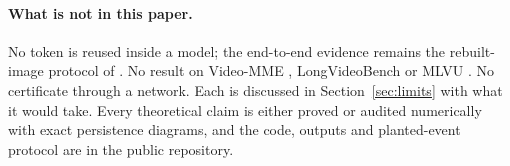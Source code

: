 \paragraph{What is not in this paper.} No token is reused inside a model; the end-to-end evidence remains the rebuilt-image protocol of \citet{nair2026certifiedskip}. No result on Video-MME \citep{fu2024videomme}, LongVideoBench \citep{wu2024longvideobench} or MLVU \citep{zhou2024mlvu}. No certificate through a network. Each is discussed in Section~\ref{sec:limits} with what it would take. Every theoretical claim is either proved or audited numerically with exact persistence diagrams, and the code, outputs and planted-event protocol are in the public repository.
